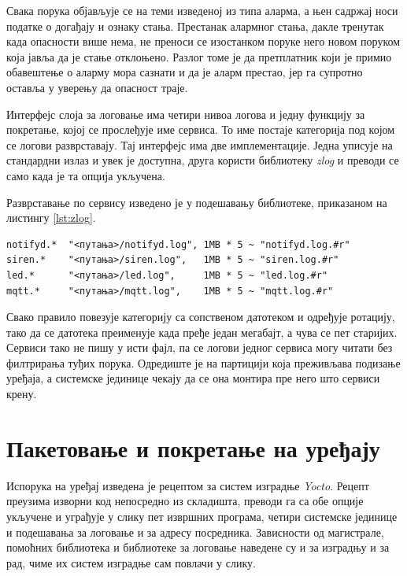 \documentclass[12pt,oneside]{memoir}
\begin{document}
Свака порука објављује се на теми изведеној из типа аларма, а њен садржај носи податке о
догађају и ознаку стања. Престанак алармног стања, дакле тренутак када опасности више нема,
не преноси се изостанком поруке него новом поруком која јавља да је стање отклоњено. Разлог
томе је да претплатник који је примио обавештење о аларму мора сазнати и да је аларм престао,
јер га супротно оставља у уверењу да опасност траје.

Интерфејс слоја за логовање има четири нивоа логова и једну функцију за покретање, којој
се прослеђује име сервиса. То име постаје категорија под којом се логови разврставају.
Тај интерфејс има две имплементације. Једна уписује на стандардни излаз и увек је
доступна, друга користи библиотеку \emph{zlog} и преводи се само када је та опција укључена.

Разврставање по сервису изведено је у подешавању библиотеке, приказаном на листингу
\ref{lst:zlog}.

\begin{lstlisting}[basicstyle=\ttfamily\footnotesize,caption={Правила за разврставање логова
по сервису},label={lst:zlog}]
notifyd.*  "<путања>/notifyd.log", 1MB * 5 ~ "notifyd.log.#r"
siren.*    "<путања>/siren.log",   1MB * 5 ~ "siren.log.#r"
led.*      "<путања>/led.log",     1MB * 5 ~ "led.log.#r"
mqtt.*     "<путања>/mqtt.log",    1MB * 5 ~ "mqtt.log.#r"
\end{lstlisting}

Свако правило повезује категорију са сопственом датотеком и одређује ротацију, тако да се
датотека преименује када пређе један мегабајт, а чува се пет старијих. Сервиси тако не пишу
у исти фајл, па се логови једног сервиса могу читати без филтрирања туђих порука. Одредиште је на
партицији која преживљава подизање уређаја, а системске јединице чекају да се она монтира
пре него што сервиси крену.

\section{Пакетовање и покретање на уређају}
\label{sec:impl-pakovanje}

Испорука на уређај изведена је рецептом за систем изградње
\emph{Yocto}. Рецепт преузима изворни код непосредно из складишта, преводи га са обе опције
укључене и уграђује у слику пет извршних програма, четири системске јединице и подешавања
за логовање и за адресу посредника. Зависности од
магистрале, помоћних библиотека и библиотеке за логовање наведене су и за изградњу и за
рад, чиме их систем изградње сам повлачи у слику.
\end{document}
